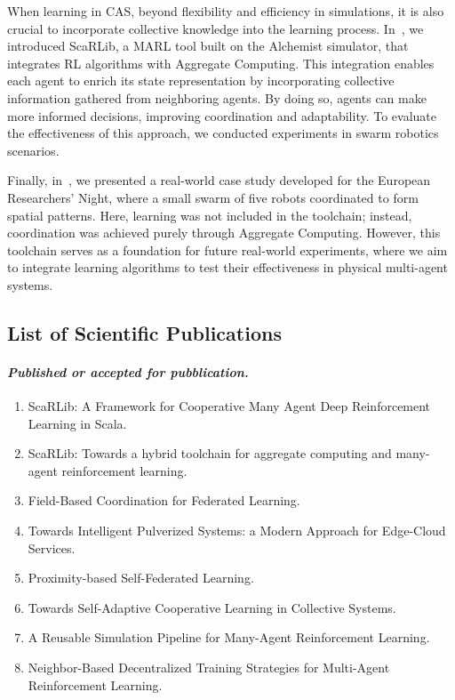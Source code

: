 \documentclass[12pt]{article}
\begin{document}
When learning in CAS, beyond flexibility and efficiency in simulations, it is also crucial to incorporate 
 collective knowledge into the learning process. 
% 
In~\cite{DBLP:conf/coordination/DominiCAV23,DBLP:journals/scp/DominiCAV24}, we introduced ScaRLib, a MARL tool built on the Alchemist simulator, 
 that integrates RL algorithms with Aggregate Computing.
%
This integration enables each agent to enrich its state representation by incorporating collective information gathered from neighboring agents. 
%
By doing so, agents can make more informed decisions, improving coordination and adaptability.
% 
To evaluate the effectiveness of this approach, we conducted experiments in swarm robotics scenarios.

Finally, in~\cite{DBLP:conf/coordination/AguzziNDR25}, we presented a real-world case study developed for the 
 European Researchers' Night, where a small swarm of five robots coordinated to form spatial patterns.
%
Here, learning was not included in the toolchain; instead, coordination was achieved purely through Aggregate Computing. 
%
However, this toolchain serves as a foundation for future real-world experiments, where we aim to integrate learning algorithms 
 to test their effectiveness in physical multi-agent systems.

\subsection{List of Scientific Publications}\label{sec:pubblications}

 \sloppypar
 \paragraph{\emph{Published or accepted for pubblication.}}
 
 \begin{enumerate}
	 \item ScaRLib: A Framework for Cooperative Many Agent Deep Reinforcement 
	  Learning in Scala.~\cite{DBLP:conf/coordination/DominiCAV23}
	 \item ScaRLib: Towards a hybrid toolchain for aggregate computing and many-agent 
	  reinforcement learning.~\cite{DBLP:journals/scp/DominiCAV24}
	 \item Field-Based Coordination for Federated Learning.~\cite{DBLP:conf/coordination/DominiAEV24}
	 \item Towards Intelligent Pulverized Systems: a Modern Approach 
	  for Edge-Cloud Services.~\cite{DBLP:conf/woa/DominiFAV24}
	 \item Proximity-based Self-Federated Learning.~\cite{DBLP:journals/corr/abs-2407-12410}
	 \item Towards Self-Adaptive Cooperative Learning in Collective Systems.~\cite{DBLP:conf/acsos/Domini24}
	 \item A Reusable Simulation Pipeline for Many-Agent Reinforcement Learning.~\cite{DBLP:conf/dsrt/DominiAPV24}
	 \item Neighbor-Based Decentralized Training Strategies for Multi-Agent 
	  Reinforcement Learning.~\cite{DBLP:conf/sac/MalucelliDAV25}
 \end{enumerate}
 
\end{document}
